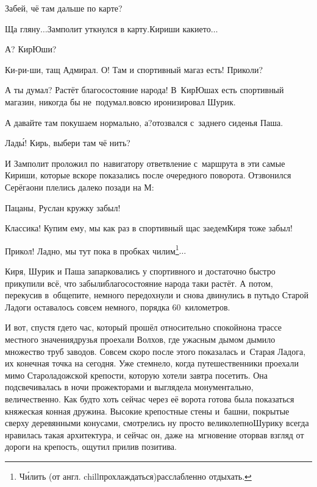 \diagdash Забей, чё там дальше по карте?

\diagdash Ща гляну$\ldots$\mdash Замполит уткнулся в карту.\mdash Кириши какие\sdash то$\ldots$

\diagdash А? КирЮши?

\diagdash Ки-ри-ши, тащ Адмирал. О! Там и спортивный магаз есть! Приколи?

\diagdash А ты думал? Растёт благосостояние народа! В~КирЮшах есть спортивный магазин, никогда бы не~подумал.\mdash вовсю иронизировал Шурик.

\diagdash А давайте там покушаем нормально, а?\mdash отозвался с~заднего сиденья Паша.

\diagdash Лад\'{ы}! Кирь, выбери там чё нить?

И Замполит проложил по~навигатору ответвление с~маршрута в эти самые Кириши, которые вскоре показались после очередного поворота. Отзвонился Серёга\mdash они плелись далеко позади на М:

\diagdash Пацаны, Руслан кружку забыл!

\diagdash Классика! Купим ему, мы как раз в спортивный щас заедем\mdash Киря тоже забыл!

\renewcommand*{\thefootnote}{\fnsymbol{footnote}}
\setcounter{footnote}{0}
\diagdash Прикол! Ладно, мы тут пока в пробках чилим\footnote{Ч\'{и}лить (от англ. chill\mdash прохлаждаться)\mdash расслабленно отдыхать.}$\ldots$

Киря, Шурик и Паша запарковались у спортивного и достаточно быстро прикупили всё, что забыли\mdash благосостояние народа таки растёт. А потом, перекусив в~общепите, немного передохнули и снова двинулись в путь\mdash до Старой Ладоги оставалось совсем немного, порядка 60~километров.

И вот, спустя где\sdash то час, который прошёл относительно спокойно\mdash на трассе местного значения\mdash друзья проехали Волхов, где ужасным дымом дымило множество труб заводов. Совсем скоро после этого показалась и~Старая Ладога, их конечная точка на сегодня. Уже стемнело, когда путешественники проехали мимо Староладожской крепости, которую хотели завтра посетить. Она подсвечивалась в ночи прожекторами и выглядела монументально, величественно. Как будто хоть сейчас через её ворота готова была показаться княжеская конная дружина. Высокие крепостные стены и~башни, покрытые сверху деревянными конусами, смотрелись ну просто великолепно\mdash Шурику всегда нравилась такая архитектура, и сейчас он, даже на~мгновение оторвав взгляд от дороги на крепость, ощутил прилив позитива. 

